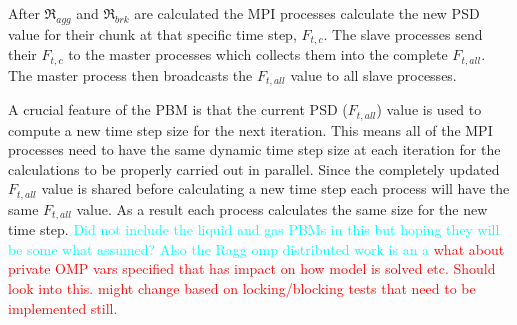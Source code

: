 \documentclass[preprint,11pt,authoryear]{elsarticle}
\begin{document}
	    \par After $\Re_{agg}$ and $\Re_{brk}$ are calculated the MPI processes calculate the new PSD value for their chunk at that specific time step, $F_{t,c}$. The slave processes send their $F_{t,c}$ to the master processes which collects them into the complete $F_{t,all}$. The master process then broadcasts the $F_{t,all}$ value to all slave processes. 	
	    \par A crucial feature of the PBM is that the current PSD ($F_{t,all}$) value is used to compute a new time step size for the next iteration. This means all of the MPI processes need to have the same dynamic time step size at each iteration for the calculations to be properly carried out in parallel. Since the completely updated $F_{t,all}$ value is shared before calculating a new time step each process will have the same $F_{t,all}$ value. As a result each process calculates the same size for the new time step. 
	\textcolor{cyan}{ Did not include the liquid and gas PBMs in this but hoping they will be some what assumed? Also the Ragg omp distributed work is an a}
	\textcolor{red}{what about private OMP vars specified that has impact on how model is solved etc. Should look into this. might change based on locking/blocking tests that need to be implemented still.}   
	
\end{document}
